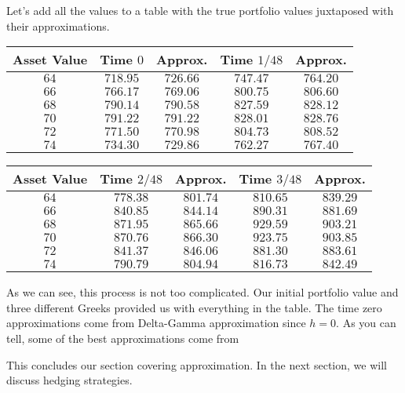 \documentclass{ximera}
\begin{document}
Let's add all the values to a table with the true portfolio values juxtaposed with their approximations.

\begin{center}
	\begin{tabular}{c|cc|cc}
	Asset Value 	& Time $0$   	& Approx.	& Time $1/48$ 	& Approx. 	\\
	\hline
	$64$		& $718.95$	& $726.66$	& $747.47$		& $764.20$	\\
	$66$		& $766.17$	& $769.06$	& $800.75$		& $806.60$	\\
	$68$		& $790.14$	& $790.58$	& $827.59$		& $828.12$	\\
	$70$		& $791.22$	& $791.22$	& $828.01$		& $828.76$	\\
	$72$		& $771.50$	& $770.98$	& $804.73$		& $808.52$	\\
	$74$		& $734.30$	& $729.86$	& $762.27$		& $767.40$	
	\end{tabular}

	\begin{tabular}{c|cc|cc}
	Asset Value 	& Time $2/48$ 	& Approx. 	& Time $3/48$ 	& Approx.	\\
	\hline
	$64$		& $778.38$		& $801.74$	& $810.65$		& $839.29$	\\
	$66$		& $840.85$		& $844.14$	& $890.31$		& $881.69$	\\
	$68$		& $871.95$		& $865.66$	& $929.59$		& $903.21$	\\
	$70$		& $870.76$		& $866.30$	& $923.75$		& $903.85$	\\
	$72$		& $841.37$		& $846.06$	& $881.30$		& $883.61$	\\
	$74$		& $790.79$		& $804.94$	& $816.73$		& $842.49$
	\end{tabular}
\end{center}

As we can see, this process is not too complicated. Our initial portfolio value and three different Greeks provided us with everything in the table. The time zero approximations come from Delta-Gamma approximation since $h=0$. As you can tell, some of the best approximations come from 

This concludes our section covering approximation. In the next section, we will discuss hedging strategies. 
\end{document}
